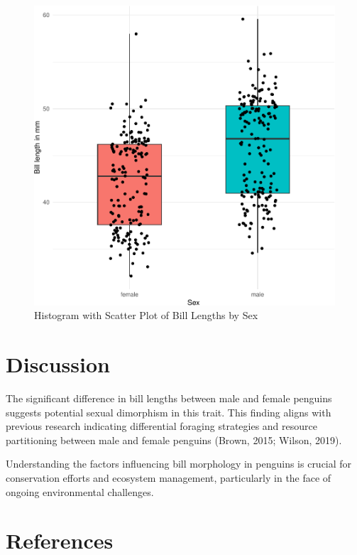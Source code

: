 \documentclass[
  man,
  longtable,
  nolmodern,
  notxfonts,
  notimes,
  colorlinks=true,linkcolor=blue,citecolor=blue,urlcolor=blue]{apa7}
\begin{document}
\begin{figure}[H]

\caption{Histogram with Scatter Plot of Bill Lengths by Sex}

{\centering \includegraphics{Manuscript_files/figure-pdf/bill_length_comparison-1.pdf}

}

\end{figure}%

\section{Discussion}\label{discussion}

The significant difference in bill lengths between male and female
penguins suggests potential sexual dimorphism in this trait. This
finding aligns with previous research indicating differential foraging
strategies and resource partitioning between male and female penguins
(Brown, 2015; Wilson, 2019).

Understanding the factors influencing bill morphology in penguins is
crucial for conservation efforts and ecosystem management, particularly
in the face of ongoing environmental challenges.

\section{References}\label{references}
\end{document}
